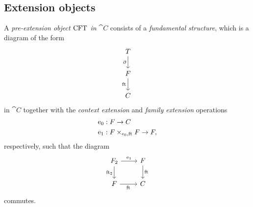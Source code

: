 \subsection{Extension objects}
\begin{defn}
A \emph{pre-extension object $\mathrm{CFT}$ in $\cat{C}$} consists of a \emph{fundamental structure}, which is a diagram of the form
\begin{equation*}
\begin{tikzcd}
\stesyst
  \ar{d}[swap]{\ebd}
  \\
\stesysf
  \ar{d}[swap]{\eft}
  \\
\stesysc
\end{tikzcd}
\end{equation*}
in $\cat{C}$ together with the \emph{context extension} and \emph{family extension} operations
\begin{align*}
\ectxext &:\stesysf\to \stesysc\\
\efamext & :\stesysff\to \stesysf,
\end{align*}
respectively, such that the diagram
\begin{equation*}
\begin{tikzcd}
\stesysf_2 
  \ar{r}{\efamext} 
  \ar{d}[swap]{\eft[2]} 
  & 
\stesysf 
  \ar{d}{\eft}
  \\
\stesysf
  \ar{r}[swap]{\eft} 
  & 
\stesysc
\end{tikzcd}
\end{equation*}
commutes.
\end{defn}

